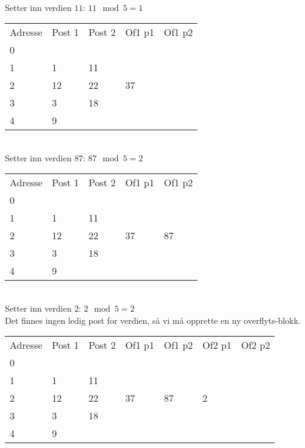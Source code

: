 \documentclass[a4paper, 12pt] {article}
\begin{document}
~\\
Setter inn verdien $11$: $11 \mod 5 = 1$\\
\begin{tabular}{|l|l|l|l|l|}
    \hline
    Adresse & Post 1 & Post 2 & Of1 p1 & Of1 p2 \\
    0       & ~      & ~      & ~      & ~      \\
    1       & 1      & 11     & ~      & ~      \\
    2       & 12     & 22     & 37     & ~      \\
    3       & 3      & 18     & ~      & ~      \\
    4       & 9      & ~      & ~      & ~      \\ \hline
\end{tabular}

~\\
Setter inn verdien $87$: $87 \mod 5 = 2$\\
\begin{tabular}{|l|l|l|l|l|}
    \hline
    Adresse & Post 1 & Post 2 & Of1 p1 & Of1 p2 \\
    0       & ~      & ~      & ~      & ~      \\
    1       & 1      & 11     & ~      & ~      \\
    2       & 12     & 22     & 37     & 87     \\
    3       & 3      & 18     & ~      & ~      \\
    4       & 9      & ~      & ~      & ~      \\ \hline
\end{tabular}

~\\
Setter inn verdien $2$: $2 \mod 5 = 2$\\
Det finnes ingen ledig post for verdien, så vi må opprette en ny overflyts-blokk.\\
\begin{tabular}{|l|l|l|l|l|l|l|}
    \hline
    Adresse & Post 1 & Post 2 & Of1 p1 & Of1 p2 & Of2 p1 & Of2 p2 \\
    0       & ~      & ~      & ~      & ~      & ~      & ~      \\
    1       & 1      & 11     & ~      & ~      & ~      & ~      \\
    2       & 12     & 22     & 37     & 87     & 2      & ~      \\
    3       & 3      & 18     & ~      & ~      & ~      & ~      \\
    4       & 9      & ~      & ~      & ~      & ~      & ~      \\ \hline
\end{tabular}
\end{document}
